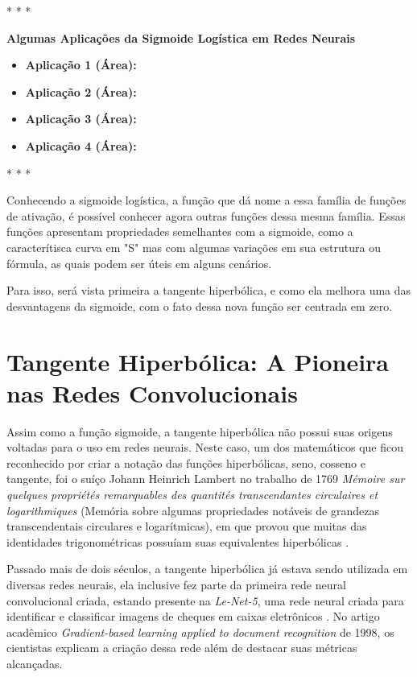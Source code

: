 \medskip
\begin{center}
 * * *
\end{center}
\medskip

\textbf{Algumas Aplicações da Sigmoide Logística em Redes Neurais}
\vspace{1em}

\begin{itemize}
    \item \textbf{Aplicação 1 (Área):}
    \item \textbf{Aplicação 2 (Área):}
    \item \textbf{Aplicação 3 (Área):}
    \item \textbf{Aplicação 4 (Área):}
\end{itemize}

\medskip
\begin{center}
 * * *
\end{center}
\medskip

Conhecendo a sigmoide logística, a função que dá nome a essa família de funções de ativação, é possível conhecer agora outras funções dessa mesma família. Essas funções apresentam propriedades semelhantes com a sigmoide, como a caracterítisca curva em "S" mas com algumas variações em sua estrutura ou fórmula, as quais podem ser úteis em alguns cenários.

Para isso, será vista primeira a tangente hiperbólica, e como ela melhora uma das desvantagens da sigmoide, com o fato dessa nova função ser centrada em zero.

\section{Tangente Hiperbólica: A Pioneira nas Redes Convolucionais} 

Assim como a função sigmoide, a tangente hiperbólica não possui suas origens voltadas para o uso em redes neurais. Neste caso, um dos matemáticos que ficou reconhecido por criar a notação das funções hiperbólicas, seno, cosseno e tangente, foi o suíço Johann Heinrich Lambert no trabalho de 1769 \textit{Mémoire sur quelques propriétés remarquables des quantités transcendantes circulaires et logarithmiques} (Memória sobre algumas propriedades notáveis de grandezas transcendentais circulares e logarítmicas), em que provou que muitas das identidades trigonométricas possuíam suas equivalentes hiperbólicas \parencite{TanhLambert}.

Passado mais de dois séculos, a tangente hiperbólica já estava sendo utilizada em diversas redes neurais, ela inclusive fez parte da primeira rede neural convolucional criada, estando presente na \textit{Le-Net-5}, uma rede neural criada para identificar e classificar imagens de cheques em caixas eletrônicos \parencite{LecunLeNet1998}. No artigo acadêmico \textit{Gradient-based learning applied to document recognition} de 1998, os cientistas \textcite{LecunLeNet1998} explicam a criação dessa rede além de destacar suas métricas alcançadas.

